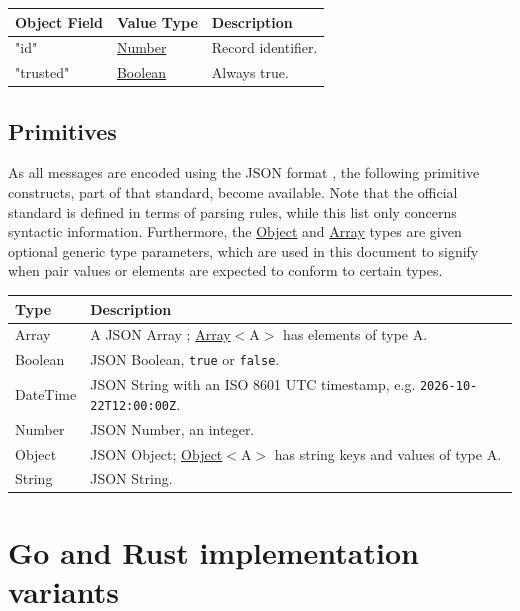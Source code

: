 \documentclass[a4paper]{arrowhead}
\newcommand{\pdef}[1]{{\textcolor{ArrowheadGrey}{#1 \label{sec:model:primitives:#1} \label{sec:model:primitives:#1s}}}}
\newcommand{\pref}[1]{{\textcolor{ArrowheadGrey}{\hyperref[sec:model:primitives:#1]{#1}}}}
\begin{document}




\noindent\begin{tabularx}{\textwidth}{| >{\raggedright\arraybackslash}p{3.9cm} | >{\raggedright\arraybackslash\small}p{5.3cm} | X |} \hline
\rowcolor{gray!33} Object Field & Value Type & Description \\ \hline
"id" & \pref{Number} & Record identifier. \\ \hline
"trusted" & \pref{Boolean} & Always true. \\ \hline
\end{tabularx}



\subsection{Primitives}
\label{sec:model:primitives}

As all messages are encoded using the JSON format \cite{rfc8259}, the following primitive constructs, part of that standard, become available.
Note that the official standard is defined in terms of parsing rules, while this list only concerns syntactic information.
Furthermore, the \pref{Object} and \pref{Array} types are given optional generic type parameters, which are used in this document to signify when pair values or elements are expected to conform to certain types.

\noindent\begin{tabularx}{\textwidth}{| p{4.6cm} | X |} \hline
\rowcolor{gray!33} Type & Description \\ \hline
\pdef{Array} & A JSON Array \cite{rfc8259}; \pref{Array}$<$A$>$ has elements of type A. \\ \hline
\pdef{Boolean} & JSON Boolean, \texttt{true} or \texttt{false}. \\ \hline
\pdef{DateTime} & JSON String with an ISO 8601 UTC timestamp, e.g. \texttt{2026-10-22T12:00:00Z}. \\ \hline
\pdef{Number} & JSON Number, an integer. \\ \hline
\pdef{Object} & JSON Object; \pref{Object}$<$A$>$ has string keys and values of type A. \\ \hline
\pdef{String} & JSON String. \\ \hline
\end{tabularx}

\newpage

\section{Go and Rust implementation variants}
\end{document}
